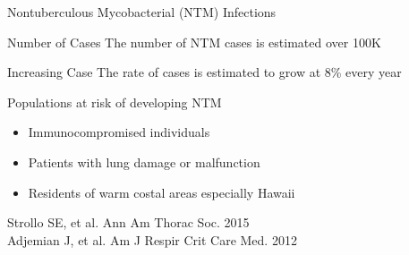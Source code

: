 \documentclass[11pt]{beamer}
\begin{document}
	\begin{frame}{Nontuberculous Mycobacterial (NTM) Infections}
		\begin{block}{Number of Cases}
		The number of NTM cases is estimated over 100K
		\end{block}
		
		\begin{block}{Increasing Case}
		The rate of cases is estimated to grow at 8\% every year
		\end{block}
		
		
		\begin{block}{Populations at risk of developing NTM}
		\begin{itemize}
		\item Immunocompromised individuals 
		\item Patients with lung damage or malfunction 
		\item Residents of warm costal areas especially Hawaii
		\end{itemize}
		\end{block} 
		
		\begin{block}
		
		\end{block}
	\vspace{-1cm}
	\tiny{Strollo SE, et al. Ann Am Thorac Soc. 2015 \\
	Adjemian J, et al. Am J Respir Crit Care Med. 2012}
	
	\end{frame}
	
\end{document}
